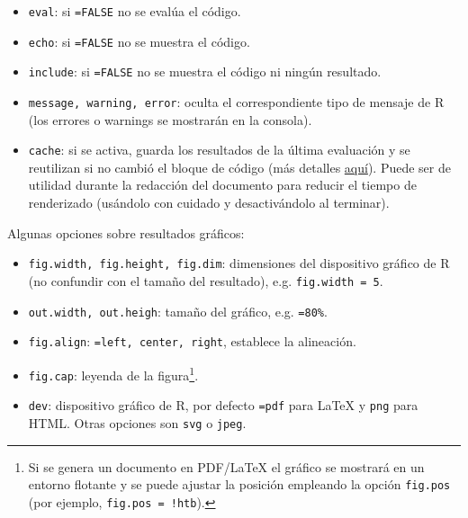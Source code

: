 \documentclass[]{book}
\providecommand{\tightlist}{%
  \setlength{\itemsep}{0pt}\setlength{\parskip}{0pt}}
\let\rmarkdownfootnote\footnote%
\def\footnote{\protect\rmarkdownfootnote}
\theoremstyle{definition}
\theoremstyle{definition}
\theoremstyle{definition}
\theoremstyle{remark}
\begin{document}
\begin{itemize}
\tightlist
\item
  \texttt{eval}: si \texttt{=FALSE} no se evalúa el código.
\item
  \texttt{echo}: si \texttt{=FALSE} no se muestra el código.
\item
  \texttt{include}: si \texttt{=FALSE} no se muestra el código ni ningún
  resultado.
\item
  \texttt{message,\ warning,\ error}: oculta el correspondiente tipo de
  mensaje de R (los errores o warnings se mostrarán en la consola).
\item
  \texttt{cache}: si se activa, guarda los resultados de la última
  evaluación y se reutilizan si no cambió el bloque de código (más
  detalles \href{https://yihui.name/knitr/options/\#cache}{aquí}). Puede
  ser de utilidad durante la redacción del documento para reducir el
  tiempo de renderizado (usándolo con cuidado y desactivándolo al
  terminar).
\end{itemize}

Algunas opciones sobre resultados gráficos:

\begin{itemize}
\tightlist
\item
  \texttt{fig.width,\ fig.height,\ fig.dim}: dimensiones del dispositivo
  gráfico de R (no confundir con el tamaño del resultado), e.g.
  \texttt{fig.width\ =\ 5}.
\item
  \texttt{out.width,\ out.heigh}: tamaño del gráfico, e.g.
  \texttt{=\textquotesingle{}80\%\textquotesingle{}}.
\item
  \texttt{fig.align}:
  \texttt{=\textquotesingle{}left\textquotesingle{},\ \textquotesingle{}center\textquotesingle{},\ \textquotesingle{}right\textquotesingle{}},
  establece la alineación.
\item
  \texttt{fig.cap}: leyenda de la figura\footnote{Si se genera un
    documento en PDF/LaTeX el gráfico se mostrará en un entorno flotante
    y se puede ajustar la posición empleando la opción \texttt{fig.pos}
    (por ejemplo,
    \texttt{fig.pos\ =\ \textquotesingle{}!htb\textquotesingle{}}).}.
\item
  \texttt{dev}: dispositivo gráfico de R, por defecto
  \texttt{=\textquotesingle{}pdf\textquotesingle{}} para LaTeX y
  \texttt{\textquotesingle{}png\textquotesingle{}} para HTML. Otras
  opciones son \texttt{\textquotesingle{}svg\textquotesingle{}} o
  \texttt{\textquotesingle{}jpeg\textquotesingle{}}.
\end{itemize}
\end{document}
